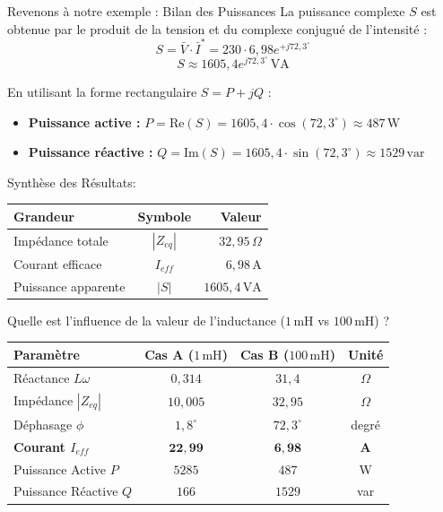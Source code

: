 	\begin{frame}[allowframebreaks]{Revenons à notre exemple : Bilan des Puissances}
	La puissance complexe $S$ est obtenue par le produit de la tension et du complexe conjugué de l'intensité :
	\[ {S} = \bar{V} \cdot \bar{I}^* = 230 \cdot 6,98e^{+j72,3^\circ} \]
	\[ {S} \approx 1605,4e^{j72,3^\circ} \, \text{VA} \]

	En utilisant la forme rectangulaire ${S} = P + jQ$ :
	\begin{itemize}
		\item \textbf{Puissance active :} $P = \text{Re}({S}) = 1605,4 \cdot \cos(72,3^\circ) \approx 487 \, \text{W}$
		\item \textbf{Puissance réactive :} $Q = \text{Im}({S}) = 1605,4 \cdot \sin(72,3^\circ) \approx 1529 \, \text{var}$
	\end{itemize}

	Synthèse des Résultats:
	\begin{table}[h]
		\centering
		\begin{tabular}{lcr}
			\toprule
			Grandeur & Symbole & Valeur \\
			\midrule
			Impédance totale & $|Z_{eq}|$ & $32,95 \, \Omega$ \\
			Courant efficace & $I_{eff}$ & $6,98 \, \text{A}$ \\
			Puissance apparente & $|S|$ & $1605,4 \, \text{VA}$ \\
			\bottomrule
		\end{tabular}
	\end{table}

	
	\alert{Quelle est l'influence de la valeur de l'inductance ($1 \, \text{mH}$ vs $100 \, \text{mH}$)} ?


	
	\begin{center}
		\begin{tabular}{@{}lccc@{}}
			\toprule
			\textbf{Paramètre} & \textbf{Cas A ($1 \, \text{mH}$)} & \textbf{Cas B ($100 \, \text{mH}$)} & \textbf{Unité} \\
			\midrule
			Réactance $L\omega$ & $0,314$ & $31,4$ & $\Omega$ \\
			Impédance $|Z_{eq}|$ & $10,005$ & $32,95$ & $\Omega$ \\
			Déphasage $\phi$ & $1,8^\circ$ & $72,3^\circ$ & degré \\
			\midrule
			\textbf{Courant $I_{eff}$} & $\mathbf{22,99}$ & $\mathbf{6,98}$ & \textbf{A} \\
			\midrule
			Puissance Active $P$ & $5285$ & $487$ & W \\
			Puissance Réactive $Q$ & $166$ & $1529$ & var \\
			\bottomrule
		\end{tabular}
	\end{center}


\end{frame}
